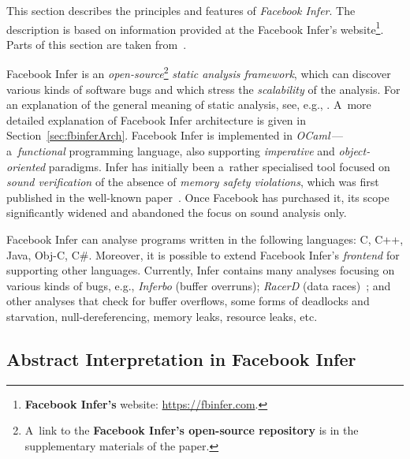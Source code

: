 \documentclass{ExcelAtFIT}
\theoremstyle{example}
\begin{document}
This section describes the principles and features of \emph{Facebook Infer}. The description is based on information provided at the Facebook Infer's website\footnote{\textbf{Facebook Infer's} website: \url{https://fbinfer.com}.}. Parts of this section are taken from~\cite{harmimBP}.

Facebook Infer is an \emph{open-source}\footnote{A~link to the \textbf{Facebook Infer's open-source repository} is in the supplementary materials of the paper.} \emph{static analysis framework}, which can discover various kinds of software bugs and which stress the \emph{scalability} of the analysis. For an explanation of the general meaning of static analysis, see, e.g., \cite{staticAnalysisMoller, programAnalysisNielson, staticAnalysisRival}. A~more detailed explanation of Facebook Infer architecture is given in Section~\ref{sec:fbinferArch}. Facebook Infer is implemented in \emph{OCaml}\,---\,a~\emph{functional} programming language, also supporting \emph{imperative} and \emph{object-oriented} paradigms. Infer has initially been a~rather specialised tool focused on \emph{sound verification} of the absence of \emph{memory safety violations}, which was first published in the well-known paper~\cite{inferBiabduction}. Once Facebook has purchased it, its scope significantly widened and abandoned the focus on sound analysis only.

Facebook Infer can analyse programs written in the following languages: C, C++, Java, Obj-C, C\#. Moreover, it is possible to extend Facebook Infer's \emph{frontend} for supporting other languages. Currently, Infer contains many analyses focusing on various kinds of bugs, e.g., \emph{Inferbo} (buffer overruns); \emph{RacerD} (data races)~\cite{racerD}; and other analyses that check for buffer overflows, some forms of deadlocks and starvation, null-dereferencing, memory leaks, resource leaks, etc.

\subsection{Abstract Interpretation in Facebook Infer}
\end{document}
